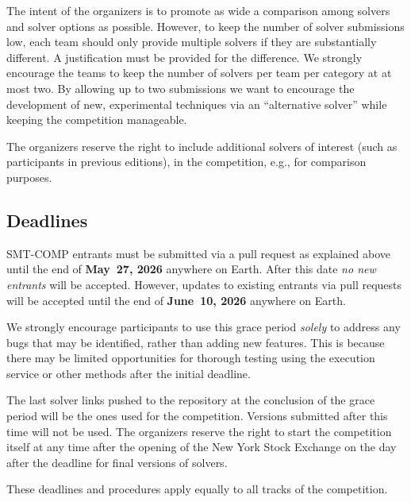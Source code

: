 \documentclass[12pt]{article}
\newcommand{\executionservice}{execution service\xspace}
\begin{document}
%
The intent of the organizers is to promote as wide a comparison among
solvers and solver options as possible.  However, to keep the number of
solver submissions low, each team should only provide multiple solvers
if they are  substantially different.  A justification must be provided
for the difference.  We strongly encourage the teams to keep the number
of solvers per team per category at at most two. By allowing
up to two submissions we want to encourage the development of new,
experimental techniques via an ``alternative solver'' while keeping
the competition manageable.

%
The organizers reserve the right to include additional solvers of interest (such as participants in previous editions),
in the competition, e.g., for comparison purposes.

%


\subsection*{Deadlines}

SMT-COMP entrants must be submitted via a pull request as explained above until the end of
{\bf May~27, 2026} anywhere on Earth.
After this date \emph{no new entrants} will be accepted.
However, updates to existing entrants via pull requests
will be accepted until the end of {\bf June~10, 2026} anywhere on Earth.

We strongly encourage participants to use this grace period
\emph{solely} to address any bugs that may be identified,
rather than adding new features. This is because there may be limited opportunities for
thorough testing using the \executionservice or other methods after the initial deadline.

The last solver links pushed to the repository at the conclusion of
the grace period will be the ones used for the competition.  Versions
submitted after this time will not be used.  The organizers reserve
the right to start the competition itself at any time after the opening
of the New York Stock Exchange on the day after the deadline for final versions of solvers.

These deadlines and procedures apply equally to all tracks of the
competition.
\end{document}
